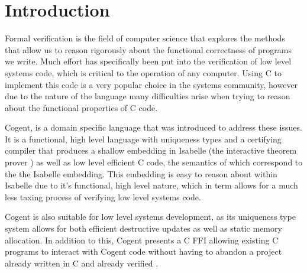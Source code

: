 \chapter{Introduction}\label{ch:intro}

Formal verification is the field of computer science that explores the methods that allow us to
  reason rigorously about the functional correctness of programs we write. 
Much effort has specifically been put into the verification of low level systems code,
  which is critical to the operation of any computer.
Using C to implement this code is a very popular choice in the systems community,
  however due to the nature of the language many difficulties arise when trying to
  reason about the functional properties of C code.

Cogent\cite{ICFPCogent}, is a domain specific language that was introduced to address these issues.
It is a functional, high level language with uniqueness types and a certifying compiler
  that produces a shallow embedding in Isabelle  (the interactive theorem prover ) as well as low level efficient C code,
  the semantics of which correspond to the the Isabelle embedding. 
This embedding is easy to reason about within Isabelle due to it's functional,
  high level nature, which in term allows for a much less taxing process of verifying low level systems code. 

Cogent is also suitable for low level systems development,
  as its uniqueness type system allows for both efficient destructive updates as well as static memory allocation.
In addition to this, Cogent presents a C FFI allowing existing C programs to interact with Cogent code without having to
  abandon a project already written in C and already verified .

